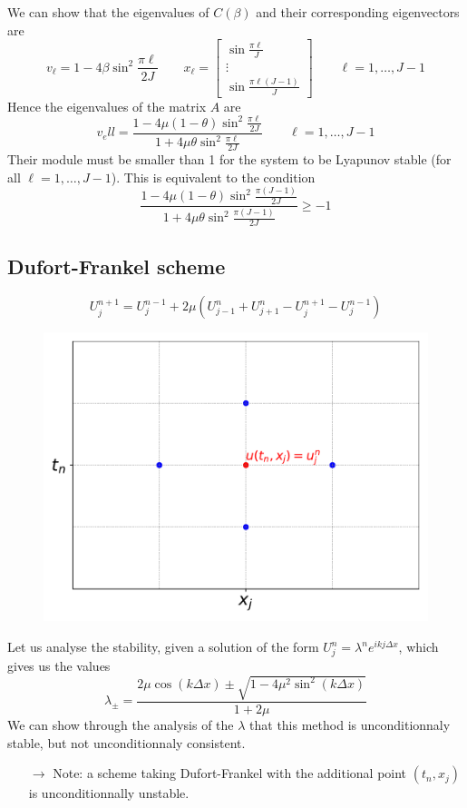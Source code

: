 \documentclass[12pt, openany]{report}
\theoremstyle{definition}
\begin{document}
We can show that the eigenvalues of $C(\beta)$ and their corresponding eigenvectors are 
\begin{equation}
	v_\ell = 1-4\beta \sin^2 \frac{\pi \ell}{2J} \qquad x_\ell = \begin{bmatrix}
		\sin\frac{\pi \ell}{J} \\ \vdots \\ \sin \frac{\pi \ell(J-1)}{J}
	\end{bmatrix} \qquad  \ell=1,\dots, J-1 
\end{equation}
Hence the eigenvalues of the matrix $A$ are 
\begin{equation}
	v_ell = \frac{1-4\mu(1-\theta) \sin^2\frac{\pi \ell}{2J}}{1+4\mu\theta \sin^2 \frac{\pi \ell}{2J}} \qquad \ell = 1,\dots,J-1
\end{equation}
Their module must be smaller than 1 for the system to be Lyapunov stable (for all $\ell= 1,\dots,J-1$). This is equivalent to the condition 
\begin{equation}
	\frac{1-4\mu(1-\theta) \sin^2\frac{\pi (J-1)}{2J}}{1+4\mu\theta \sin^2 \frac{\pi (J-1)}{2J}} \ge -1
\end{equation}
\subsection{Dufort-Frankel scheme}
\begin{equation}
	U_j^{n+1} = U_j^{n-1} + 2\mu \left(U_{j-1}^n + U_{j+1}^n - U_j^{n+1}-U_j^{n-1}\right)
\end{equation}
\begin{figure}[H]
	\centering
	\includegraphics[width = .4\textwidth]{img/DF.pdf}
\end{figure}
Let us analyse the stability, given a solution of the form $U_j^n = \lambda^n e^{ikj\Delta x}$, which gives us the values
\begin{equation}
	\lambda_\pm = \frac{2\mu \cos(k\Delta x) \pm \sqrt{1-4\mu^2\sin^2(k\Delta x)}}{1+2\mu}
\end{equation}
We can show through the analysis of the $\lambda$ that this method is unconditionnaly stable, but not unconditionnaly consistent. 
\begin{itemize}
	\item [$\to$] Note: a scheme taking Dufort-Frankel with the additional point $(t_n, x_j)$ is unconditionnally unstable. 
\end{itemize}
\end{document}
